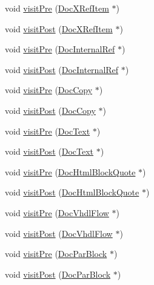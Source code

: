 \begin{DoxyCompactItemize}
\item 
void \hyperlink{class_r_t_f_doc_visitor_a9629c09a2752dcfe724740317ca7651c}{visit\+Pre} (\hyperlink{class_doc_x_ref_item}{Doc\+X\+Ref\+Item} $\ast$)
\item 
void \hyperlink{class_r_t_f_doc_visitor_acf2b25a9d1855aab61af12217c51ac05}{visit\+Post} (\hyperlink{class_doc_x_ref_item}{Doc\+X\+Ref\+Item} $\ast$)
\item 
void \hyperlink{class_r_t_f_doc_visitor_a4f3e17f860e844bd7e28b14a918e4ab1}{visit\+Pre} (\hyperlink{class_doc_internal_ref}{Doc\+Internal\+Ref} $\ast$)
\item 
void \hyperlink{class_r_t_f_doc_visitor_a13364c204ec2e54d31a59ffe017179c4}{visit\+Post} (\hyperlink{class_doc_internal_ref}{Doc\+Internal\+Ref} $\ast$)
\item 
void \hyperlink{class_r_t_f_doc_visitor_a5f6cffef9367a2f06be9ae04b5058d47}{visit\+Pre} (\hyperlink{class_doc_copy}{Doc\+Copy} $\ast$)
\item 
void \hyperlink{class_r_t_f_doc_visitor_aacb595ea274656fb2911c959a5c8c4f0}{visit\+Post} (\hyperlink{class_doc_copy}{Doc\+Copy} $\ast$)
\item 
void \hyperlink{class_r_t_f_doc_visitor_a373f9aec0d69fea3978e6b229bff4a5d}{visit\+Pre} (\hyperlink{class_doc_text}{Doc\+Text} $\ast$)
\item 
void \hyperlink{class_r_t_f_doc_visitor_aa2e46477bcc121a8065ad226bbc19c85}{visit\+Post} (\hyperlink{class_doc_text}{Doc\+Text} $\ast$)
\item 
void \hyperlink{class_r_t_f_doc_visitor_a79a569f9712e30ae63586674fd21003a}{visit\+Pre} (\hyperlink{class_doc_html_block_quote}{Doc\+Html\+Block\+Quote} $\ast$)
\item 
void \hyperlink{class_r_t_f_doc_visitor_a23c4664a66b3ef5ace0b561c51d393de}{visit\+Post} (\hyperlink{class_doc_html_block_quote}{Doc\+Html\+Block\+Quote} $\ast$)
\item 
void \hyperlink{class_r_t_f_doc_visitor_a808d7abb48ec87e6626ed071a292e248}{visit\+Pre} (\hyperlink{class_doc_vhdl_flow}{Doc\+Vhdl\+Flow} $\ast$)
\item 
void \hyperlink{class_r_t_f_doc_visitor_a600cf4c9635d8233f4a1cf887ecb5629}{visit\+Post} (\hyperlink{class_doc_vhdl_flow}{Doc\+Vhdl\+Flow} $\ast$)
\item 
void \hyperlink{class_r_t_f_doc_visitor_abd7a9f28dd5ceb088a9f50e35634a1f5}{visit\+Pre} (\hyperlink{class_doc_par_block}{Doc\+Par\+Block} $\ast$)
\item 
void \hyperlink{class_r_t_f_doc_visitor_a4b0499bd38e257ddf3c931ed5f35b903}{visit\+Post} (\hyperlink{class_doc_par_block}{Doc\+Par\+Block} $\ast$)
\end{DoxyCompactItemize}


